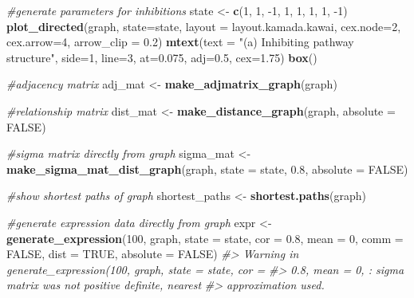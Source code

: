 \documentclass[]{article}
\newenvironment{Shaded}{\begin{snugshade}}{\end{snugshade}}
\newcommand{\CommentTok}[1]{\textcolor[rgb]{0.56,0.35,0.01}{\textit{#1}}}
\newcommand{\DataTypeTok}[1]{\textcolor[rgb]{0.13,0.29,0.53}{#1}}
\newcommand{\DecValTok}[1]{\textcolor[rgb]{0.00,0.00,0.81}{#1}}
\newcommand{\FloatTok}[1]{\textcolor[rgb]{0.00,0.00,0.81}{#1}}
\newcommand{\KeywordTok}[1]{\textcolor[rgb]{0.13,0.29,0.53}{\textbf{#1}}}
\newcommand{\NormalTok}[1]{#1}
\newcommand{\OtherTok}[1]{\textcolor[rgb]{0.56,0.35,0.01}{#1}}
\newcommand{\StringTok}[1]{\textcolor[rgb]{0.31,0.60,0.02}{#1}}
\begin{document}
\begin{Shaded}
\begin{Highlighting}[]

\CommentTok{#generate parameters for inhibitions}
\NormalTok{state <-}\StringTok{ }\KeywordTok{c}\NormalTok{(}\DecValTok{1}\NormalTok{, }\DecValTok{1}\NormalTok{, }\DecValTok{-1}\NormalTok{, }\DecValTok{1}\NormalTok{, }\DecValTok{1}\NormalTok{, }\DecValTok{1}\NormalTok{, }\DecValTok{1}\NormalTok{, }\DecValTok{-1}\NormalTok{)}
\KeywordTok{plot_directed}\NormalTok{(graph, }\DataTypeTok{state=}\NormalTok{state, }\DataTypeTok{layout =}\NormalTok{ layout.kamada.kawai,}
              \DataTypeTok{cex.node=}\DecValTok{2}\NormalTok{, }\DataTypeTok{cex.arrow=}\DecValTok{4}\NormalTok{, }\DataTypeTok{arrow_clip =} \FloatTok{0.2}\NormalTok{)}
\KeywordTok{mtext}\NormalTok{(}\DataTypeTok{text =} \StringTok{"(a) Inhibiting pathway structure"}\NormalTok{, }\DataTypeTok{side=}\DecValTok{1}\NormalTok{, }\DataTypeTok{line=}\DecValTok{3}\NormalTok{, }\DataTypeTok{at=}\FloatTok{0.075}\NormalTok{, }\DataTypeTok{adj=}\FloatTok{0.5}\NormalTok{, }\DataTypeTok{cex=}\FloatTok{1.75}\NormalTok{)}
\KeywordTok{box}\NormalTok{()}

\CommentTok{#adjacency matrix}
\NormalTok{adj_mat <-}\StringTok{ }\KeywordTok{make_adjmatrix_graph}\NormalTok{(graph)}

\CommentTok{#relationship matrix}
\NormalTok{dist_mat <-}\StringTok{ }\KeywordTok{make_distance_graph}\NormalTok{(graph, }\DataTypeTok{absolute =} \OtherTok{FALSE}\NormalTok{)}

\CommentTok{#sigma matrix directly from graph}
\NormalTok{sigma_mat <-}\StringTok{ }\KeywordTok{make_sigma_mat_dist_graph}\NormalTok{(graph, }\DataTypeTok{state =}\NormalTok{ state, }\FloatTok{0.8}\NormalTok{, }\DataTypeTok{absolute =} \OtherTok{FALSE}\NormalTok{)}

\CommentTok{#show shortest paths of graph}
\NormalTok{shortest_paths <-}\StringTok{ }\KeywordTok{shortest.paths}\NormalTok{(graph)}

\CommentTok{#generate expression data directly from graph}
\NormalTok{expr <-}\StringTok{ }\KeywordTok{generate_expression}\NormalTok{(}\DecValTok{100}\NormalTok{, graph, }\DataTypeTok{state =}\NormalTok{ state, }\DataTypeTok{cor =} \FloatTok{0.8}\NormalTok{, }\DataTypeTok{mean =} \DecValTok{0}\NormalTok{, }\DataTypeTok{comm =} \OtherTok{FALSE}\NormalTok{,}
                            \DataTypeTok{dist =} \OtherTok{TRUE}\NormalTok{, }\DataTypeTok{absolute =} \OtherTok{FALSE}\NormalTok{)}
\CommentTok{#> Warning in generate_expression(100, graph, state = state, cor =}
\CommentTok{#> 0.8, mean = 0, : sigma matrix was not positive definite, nearest}
\CommentTok{#> approximation used.}


\end{Highlighting}
\end{Shaded}
\end{document}
